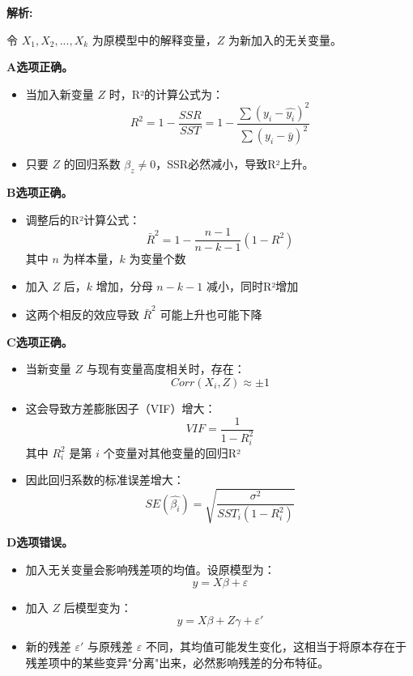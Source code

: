 \documentclass{article}
\newenvironment{explanation}
{\textbf{解析:}\par}
{\par}
\begin{document}
\begin{explanation}
令 \(X_1, X_2, ..., X_k\) 为原模型中的解释变量，\(Z\) 为新加入的无关变量。

\textbf{A选项正确。}
\begin{itemize}
    \item 当加入新变量 \(Z\) 时，R²的计算公式为：
    \[R^2 = 1 - \frac{SSR}{SST} = 1 - \frac{\sum(y_i - \hat{y_i})^2}{\sum(y_i - \bar{y})^2}\]
    \item 只要 \(Z\) 的回归系数 \(\beta_z \neq 0\)，SSR必然减小，导致R²上升。
\end{itemize}

\textbf{B选项正确。}
\begin{itemize}
    \item 调整后的R²计算公式：
    \[\bar{R}^2 = 1 - \frac{n-1}{n-k-1}(1-R^2)\]
    其中 \(n\) 为样本量，\(k\) 为变量个数
    \item 加入 \(Z\) 后，\(k\) 增加，分母 \(n-k-1\) 减小，同时R²增加
    \item 这两个相反的效应导致 \(\bar{R}^2\) 可能上升也可能下降
\end{itemize}

\textbf{C选项正确。}
\begin{itemize}
    \item 当新变量 \(Z\) 与现有变量高度相关时，存在：
    \[Corr(X_i, Z) \approx \pm 1\]
    \item 这会导致方差膨胀因子（VIF）增大：
    \[VIF = \frac{1}{1-R^2_i}\]
    其中 \(R^2_i\) 是第 \(i\) 个变量对其他变量的回归R²
    \item 因此回归系数的标准误差增大：
    \[SE(\hat{\beta_i}) = \sqrt{\frac{\sigma^2}{SST_i(1-R^2_i)}}\]
\end{itemize}

\textbf{D选项错误。}
\begin{itemize}
    \item 加入无关变量会影响残差项的均值。设原模型为：
    \[y = X\beta + \varepsilon\]
    \item 加入 \(Z\) 后模型变为：
    \[y = X\beta + Z\gamma + \varepsilon'\]
    \item 新的残差 \(\varepsilon'\) 与原残差 \(\varepsilon\) 不同，其均值可能发生变化，这相当于将原本存在于残差项中的某些变异"分离"出来，必然影响残差的分布特征。
\end{itemize}
\end{explanation}
\end{document}

